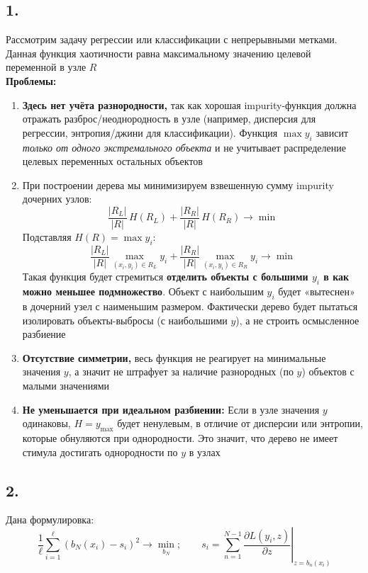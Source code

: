 \documentclass[12pt,a4paper]{article}
\begin{document}
\subsection*{1.}
Рассмотрим задачу регрессии или классификации с непрерывными метками.
Данная функция хаотичности равна максимальному значению целевой переменной
в узле $R$\\[1mm]
\textbf{Проблемы:}
\begin{enumerate}
    \item[] \textbf{Здесь нет учёта разнородности,} так как хорошая impurity-функция должна отражать разброс/неоднородность в узле (например, дисперсия для
    регрессии, энтропия/джини для классификации). Функция $\max y_i$
    зависит \emph{только от одного экстремального объекта} и не учитывает
    распределение целевых переменных остальных объектов

    \item[] При построении дерева
    мы минимизируем взвешенную сумму impurity дочерних узлов:
    \[
    \frac{|R_L|}{|R|}\,H(R_L) + \frac{|R_R|}{|R|}\,H(R_R) \to \min
    \]
    Подставляя $H(R) = \max y_i$:
    \[
    \frac{|R_L|}{|R|}\max_{(x_i,y_i)\in R_L} y_i +
    \frac{|R_R|}{|R|}\max_{(x_i,y_i)\in R_R} y_i \to \min
    \]
    Такая функция будет стремиться \textbf{отделить объекты с большими
    $y_i$ в как можно меньшее подмножество}. Объект с наибольшим $y_i$
    будет «вытеснен» в дочерний узел с наименьшим размером.
    Фактически дерево будет пытаться изолировать объекты-выбросы
    (с наибольшими $y$), а не строить осмысленное разбиение

    \item[] \textbf{Отсутствие симметрии,} весь функция не реагирует на
    минимальные значения $y$, а значит не штрафует за наличие
    разнородных (по $y$) объектов с малыми значениями

    \item[] \textbf{Не уменьшается при идеальном разбиении:} Если в узле
    значения $y$ одинаковы, $H = y_{\max}$ будет ненулевым, в отличие
    от дисперсии или энтропии, которые обнуляются при однородности.
    Это значит, что дерево не имеет стимула достигать однородности
    по $y$ в узлах
\end{enumerate}

\subsection*{2.}
Дана формулировка:
\[
\frac{1}{\ell}\sum_{i=1}^{\ell} (b_N(x_i) - s_i)^2 \to \min_{b_N};
\qquad
s_i = \sum_{n=1}^{N-1}
\left.\frac{\partial L(y_i, z)}{\partial z}\right|_{z = b_n(x_i)}
\]
\end{document}
